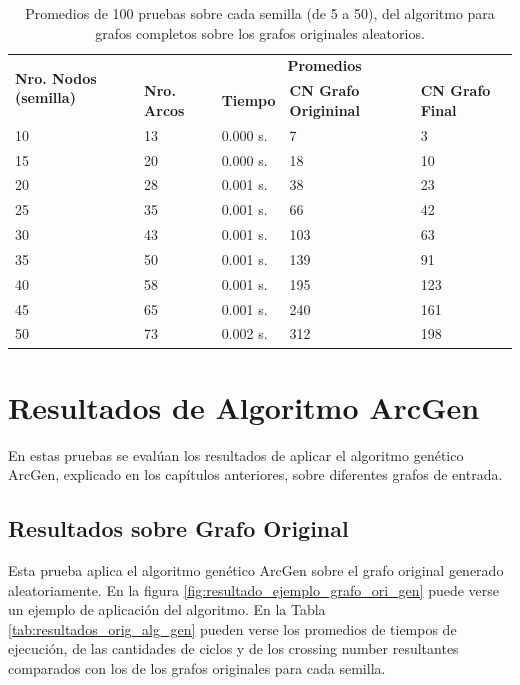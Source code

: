 \begin{table}[H]
	\caption{Promedios de 100 pruebas sobre cada semilla (de 5 a 50), del algoritmo para grafos completos sobre los grafos originales aleatorios.}
	\label{tab:resultados_orig_alg_com}
	\begin{tabularx}{\linewidth}{|p{1.5cm}|p{1.2cm}|p{1.5cm}|X|X|}
		\hline
		\multirow{2}{2cm}{\textbf{Nro. Nodos (semilla)}} & \multicolumn{4}{c|}{\textbf{Promedios}} \\
		\cline{2-5}
		& \textbf{Nro. Arcos} & \textbf{Tiempo} & \textbf{CN Grafo Origininal} & \textbf{CN Grafo Final} \\
		\hline
		10 & 13 & 0.000 s. & 7 & 3 \\
		\hline
		15 & 20 & 0.000 s. & 18 & 10 \\
		\hline
		20 & 28 & 0.001 s. & 38 & 23 \\
		\hline
		25 & 35 & 0.001 s. & 66 & 42 \\
		\hline
		30 & 43 & 0.001 s. & 103 & 63 \\
		\hline
		35 & 50 & 0.001 s. & 139 & 91 \\
		\hline
		40 & 58 & 0.001 s. & 195 & 123 \\
		\hline
		45 & 65 & 0.001 s. & 240 & 161 \\
		\hline
		50 & 73 & 0.002 s. & 312 & 198 \\
		\hline
	\end{tabularx}
\end{table}

\section{Resultados de Algoritmo ArcGen}
En estas pruebas se evalúan los resultados de aplicar el algoritmo genético ArcGen, explicado en los capítulos anteriores, sobre diferentes grafos de entrada.

\subsection{Resultados sobre Grafo Original}
Esta prueba aplica el algoritmo genético ArcGen sobre el grafo original generado aleatoriamente. En la figura \ref{fig:resultado_ejemplo_grafo_ori_gen} puede verse un ejemplo de aplicación del algoritmo. En la Tabla \ref{tab:resultados_orig_alg_gen} pueden verse los promedios de tiempos de ejecución, de las cantidades de ciclos y de los crossing number resultantes comparados con los de los grafos originales para cada semilla.

